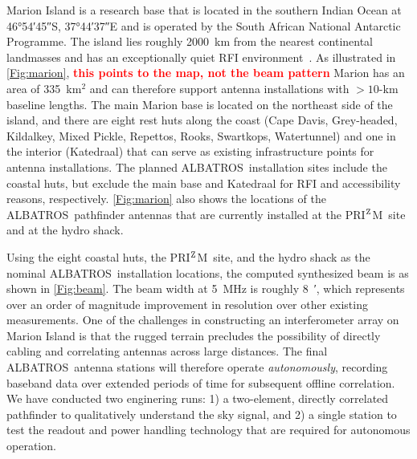 \documentclass{ws-jai}
\def\albatros{ALBATROS}
\def\prizm{PRI$^{\rm Z}$M}
\newcommand{\attention}[1]{\textcolor{red}{\bf {#1}}}
\begin{document}
Marion Island is a research base that is located in the southern
Indian Ocean at \ang{46;54;45}S, \ang{37;44;37}E and is operated by
the South African National Antarctic Programme.  The island lies
roughly \SI{2000}{\kilo\metre} from the nearest continental landmasses
and has an exceptionally quiet RFI
environment~\citep{2019JAI.....850004P}.  As illustrated in
\autoref{Fig:marion}, \attention{this points to the map, not the beam pattern} Marion has an area of 335~km$^2$ and can
therefore support antenna installations with $>10$-km baseline
lengths.  The main Marion base is located on the northeast side of the
island, and there are eight rest huts along the coast (Cape Davis,
Grey-headed, Kildalkey, Mixed Pickle, Repettos, Rooks, Swartkops,
Watertunnel) and one in the interior (Katedraal) that can serve as
existing infrastructure points for antenna installations.  The planned
\albatros\ installation sites include the coastal huts, but exclude
the main base and Katedraal for RFI and accessibility reasons,
respectively.  \autoref{Fig:marion} also shows the locations of the
\albatros\ pathfinder antennas that are currently installed at the
\prizm\ site and at the hydro shack.

Using the eight coastal huts, the \prizm\ site, and the hydro shack as
the nominal \albatros\ installation locations, the computed
synthesized beam is as shown in \autoref{Fig:beam}.  The beam width
at 5~MHz is roughly \SI{8}{\arcminute}, which represents over an order
of magnitude improvement in resolution over other existing
measurements.  One of the challenges in constructing an interferometer
array on Marion Island is that the rugged terrain precludes the
possibility of directly cabling and correlating antennas across large
distances.  The final \albatros\ antenna stations will therefore
operate {\it autonomously}, recording baseband data over extended
periods of time for subsequent offline correlation.  We have conducted
two enginering runs: 1) a two-element, directly correlated pathfinder
to qualitatively understand the sky signal, and 2) a single station to
test the readout and power handling technology that are required for
autonomous operation.
\end{document}
